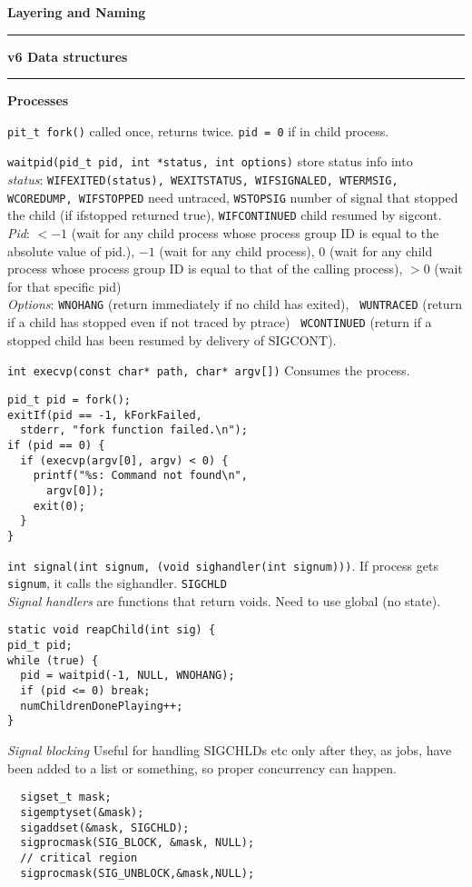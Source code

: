 \documentclass{article}
\begin{document}
\begin{multicols}{3}
  {\bf Layering and Naming}

  \noindent\rule{4cm}{0.4pt}

  {\bf v6 Data structures}

  \noindent\rule{4cm}{0.4pt}

  {\bf Processes}

  {\tt pit\_t fork()} called once, returns twice. {\tt pid = 0} if in child
  process.

  {\tt waitpid(pid\_t pid, int *status, int options)} store status info into\\
  {\it status}: {\tt WIFEXITED(status), WEXITSTATUS, WIFSIGNALED, WTERMSIG, WCOREDUMP,
  WIFSTOPPED} need untraced, {\tt WSTOPSIG} number of signal that stopped the
  child (if ifstopped returned true), {\tt WIFCONTINUED} child resumed by
  sigcont.\\
  {\it Pid}: $<-1$ (wait for any child process whose process group ID is equal to the
  absolute value of pid.), $-1$ (wait for any child process), $0$ (wait for any
  child process whose process group ID is equal to that of the calling process),
  $>0$ (wait for that specific pid)\\
  {\it Options}: {\tt WNOHANG} (return immediately if no child has exited), {\tt
  WUNTRACED} (return if a child has stopped even if not traced by ptrace) {\tt
  WCONTINUED} (return if a stopped child has been resumed by delivery of
  SIGCONT).

  {\tt int execvp(const char* path, char* argv[])} Consumes the process.
\begin{verbatim}
pid_t pid = fork();
exitIf(pid == -1, kForkFailed,
  stderr, "fork function failed.\n");
if (pid == 0) {
  if (execvp(argv[0], argv) < 0) {
    printf("%s: Command not found\n",
      argv[0]);
    exit(0);
  }
}\end{verbatim}

  {\tt int signal(int signum, (void sighandler(int signum)))}. If process gets
  {\tt signum}, it calls the sighandler. {\tt SIGCHLD}\\
  {\it Signal handlers} are functions that return voids. Need to use global (no
  state).
  \begin{verbatim}
static void reapChild(int sig) {
pid_t pid;
while (true) {
  pid = waitpid(-1, NULL, WNOHANG);
  if (pid <= 0) break;
  numChildrenDonePlaying++;
} \end{verbatim}
  {\it Signal blocking} Useful for handling SIGCHLDs etc only after they, as
  jobs, have been added to a list or something, so proper concurrency can
  happen.
  \begin{verbatim}
  sigset_t mask;
  sigemptyset(&mask);
  sigaddset(&mask, SIGCHLD);
  sigprocmask(SIG_BLOCK, &mask, NULL);
  // critical region
  sigprocmask(SIG_UNBLOCK,&mask,NULL);\end{verbatim}


\end{multicols}
\end{document}
